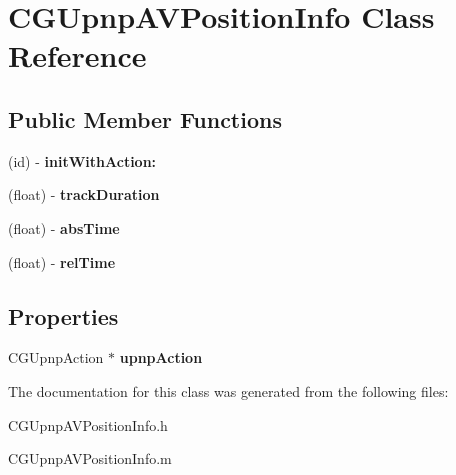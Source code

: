 \hypertarget{interface_c_g_upnp_a_v_position_info}{\section{C\-G\-Upnp\-A\-V\-Position\-Info Class Reference}
\label{interface_c_g_upnp_a_v_position_info}
}
\subsection*{Public Member Functions}
\begin{DoxyCompactItemize}
\item 
\hypertarget{interface_c_g_upnp_a_v_position_info_ae42f0d6e8c48a9ddcbf74c3bf43d9281}{(id) -\/ {\bfseries init\-With\-Action\-:}}\label{interface_c_g_upnp_a_v_position_info_ae42f0d6e8c48a9ddcbf74c3bf43d9281}

\item 
\hypertarget{interface_c_g_upnp_a_v_position_info_a8ae7ec49b450dad32b3a106bca2806b0}{(float) -\/ {\bfseries track\-Duration}}\label{interface_c_g_upnp_a_v_position_info_a8ae7ec49b450dad32b3a106bca2806b0}

\item 
\hypertarget{interface_c_g_upnp_a_v_position_info_a86a539c558e14ed469f8add9d02e77f5}{(float) -\/ {\bfseries abs\-Time}}\label{interface_c_g_upnp_a_v_position_info_a86a539c558e14ed469f8add9d02e77f5}

\item 
\hypertarget{interface_c_g_upnp_a_v_position_info_a9bcb40e4edd7740886d7e0a5fcc87ce6}{(float) -\/ {\bfseries rel\-Time}}\label{interface_c_g_upnp_a_v_position_info_a9bcb40e4edd7740886d7e0a5fcc87ce6}

\end{DoxyCompactItemize}
\subsection*{Properties}
\begin{DoxyCompactItemize}
\item 
\hypertarget{interface_c_g_upnp_a_v_position_info_aee849c49ff625e86d7a0c3dd924b5fe7}{C\-G\-Upnp\-Action $\ast$ {\bfseries upnp\-Action}}\label{interface_c_g_upnp_a_v_position_info_aee849c49ff625e86d7a0c3dd924b5fe7}

\end{DoxyCompactItemize}


The documentation for this class was generated from the following files\-:\begin{DoxyCompactItemize}
\item 
C\-G\-Upnp\-A\-V\-Position\-Info.\-h\item 
C\-G\-Upnp\-A\-V\-Position\-Info.\-m\end{DoxyCompactItemize}
